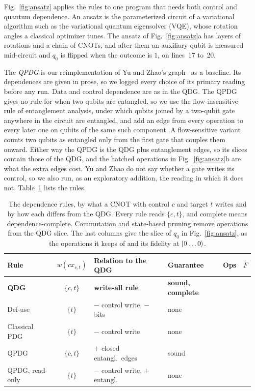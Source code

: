 Fig.~\ref{fig:ansatz} applies the rules to one program that needs both control and quantum dependence.
An ansatz is the parameterized circuit of a variational algorithm such as the variational quantum
eigensolver (VQE), whose rotation angles a classical optimizer tunes. The ansatz of Fig.~\ref{fig:ansatz}a
has layers of rotations and a chain of CNOTs, and after them an auxiliary qubit is measured mid-circuit and
$q_0$ is flipped when the outcome is $1$, on lines~17 to~20.

The \emph{QPDG} is our reimplementation of Yu and Zhao's graph~\cite{yu2025qpdg} as a baseline. Its
dependences are given in prose, so we logged every choice of its primary reading before any run. Data and
control dependence are as in the QDG. The QPDG gives no rule for when two qubits are entangled, so we use
the flow-insensitive rule of entanglement analysis, under which qubits joined by a two-qubit gate anywhere in the circuit are entangled, and add an edge from every
operation to every later one on qubits of the same such component. A flow-sensitive variant counts two
qubits as entangled only from the first gate that couples them onward. Either way the QPDG is the QDG plus entanglement edges, so its slices contain
those of the QDG, and the hatched operations in Fig.~\ref{fig:ansatz}b are what the extra edges cost. Yu and Zhao do not say whether a gate writes its control, so we also run,
as an exploratory addition, the reading in which it does not. Table~\ref{tab:rules} lists the rules.

\begin{table}[t]
  \centering
  \caption{The dependence rules, by what a CNOT with control $c$ and target $t$ writes and by how each
  differs from the QDG. Every rule reads $\{c, t\}$, and complete means dependence-complete. Commutation and
  state-based pruning remove operations from the QDG slice. The last columns give the slice of $q_0$ in
  Fig.~\ref{fig:ansatz}, as the operations it keeps of \numAnsOps{} and its fidelity at $\lvert 0\dots0\rangle$.}
  \label{tab:rules}
  \footnotesize\setlength{\tabcolsep}{2.6pt}
  \begin{tabular}{@{}l c >{\raggedright\arraybackslash}p{2.15cm} >{\raggedright\arraybackslash}p{1.25cm} r r@{}}
    \toprule
    Rule & $w(\mathit{cx}_{c,t})$ & Relation to the QDG & Guarantee & Ops & $F$ \\
    \midrule
    \textbf{QDG} & $\{c, t\}$ & \textbf{write-all rule} & \textbf{sound, complete} & \numAnsWireOps{} & \numAnsQdgFidelity{} \\
    \midrule
    Def-use & $\{t\}$ & $-$ control write, $-$ bits & none & \numAnsDuOps{} & \numAnsDuFidelity{} \\
    Classical PDG & $\{t\}$ & $-$ control write & none & \numAnsCpdgOps{} & \numAnsCpdgFidelity{} \\
    QPDG~\cite{yu2025qpdg} & $\{c, t\}$ & $+$ closed entangl.\ edges & sound & \numAnsYzOps{} & \numAnsYzFidelity{} \\
    QPDG, read-only & $\{t\}$ & $-$ control write, $+$ entangl. & none & \numAnsYzroOps{} & \numAnsYzroFidelity{} \\
    \bottomrule
  \end{tabular}
\end{table}

